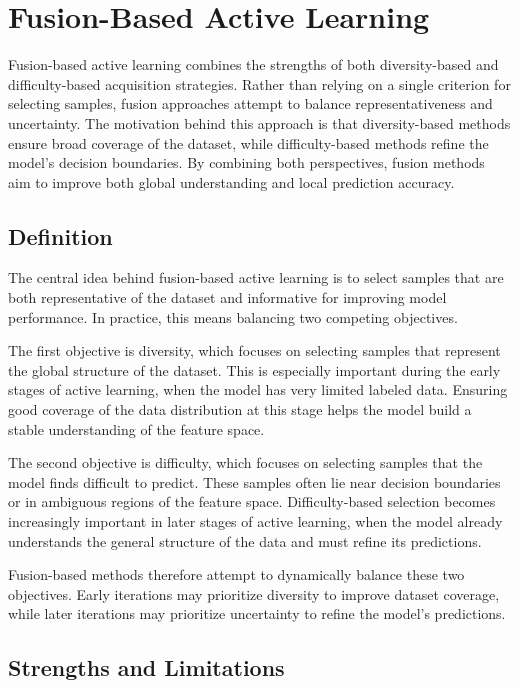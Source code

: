 \documentclass{article}
\begin{document}
\section{Fusion-Based Active Learning}

Fusion-based active learning combines the strengths of both diversity-based and difficulty-based acquisition strategies. Rather than relying on a single criterion for selecting samples, fusion approaches attempt to balance representativeness and uncertainty. The motivation behind this approach is that diversity-based methods ensure broad coverage of the dataset, while difficulty-based methods refine the model's decision boundaries. By combining both perspectives, fusion methods aim to improve both global understanding and local prediction accuracy.

\subsection{Definition}

The central idea behind fusion-based active learning is to select samples that are both representative of the dataset and informative for improving model performance. In practice, this means balancing two competing objectives.

The first objective is diversity, which focuses on selecting samples that represent the global structure of the dataset. This is especially important during the early stages of active learning, when the model has very limited labeled data. Ensuring good coverage of the data distribution at this stage helps the model build a stable understanding of the feature space.

The second objective is difficulty, which focuses on selecting samples that the model finds difficult to predict. These samples often lie near decision boundaries or in ambiguous regions of the feature space. Difficulty-based selection becomes increasingly important in later stages of active learning, when the model already understands the general structure of the data and must refine its predictions.

Fusion-based methods therefore attempt to dynamically balance these two objectives. Early iterations may prioritize diversity to improve dataset coverage, while later iterations may prioritize uncertainty to refine the model’s predictions.

\subsection{Strengths and Limitations}
\end{document}
